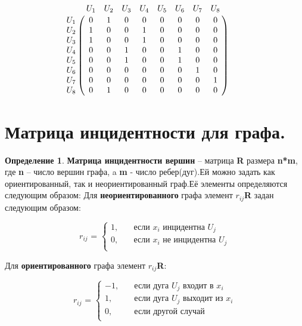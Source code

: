 \documentclass[12pt, a4paper, oneside]{article}
\theoremstyle{plain} %
\theoremstyle{definition}
\newtheorem*{definition}{Определение}  %
\newcommand{\indef}[1]{\textbf{ \color{dark_red} #1}}
\begin{document}
\[
 \bordermatrix{ & U_1 & U_2 & U_3 & U_4 & U_5 & U_6 & U_7& U_8  \cr
  U_1 & 0 & 1 & 0 & 0 & 0 & 0 & 0 & 0 \cr
  U_2 & 1 & 0 & 0 & 1 & 0 & 0 & 0 & 0   \cr
  U_3 & 1 & 0 & 0 & 1 & 0 & 0 & 0 & 0   \cr
  U_4 & 0 & 0 & 1 & 0 & 0 & 1 & 0 & 0 \cr
  U_5 & 0 & 0 & 1 & 0 & 0 & 1 & 0 & 0  \cr
  U_6 & 0 & 0 & 0 & 0 & 0 & 0 & 1 & 0 \cr
  U_7 & 0 & 0 & 0 & 0 & 0 & 0 & 0 & 1 \cr
  U_8 & 0 & 1 & 0 & 0 & 0 & 0 & 0 & 0  } \qquad
\] 

\section{Матрица инцидентности  для графа.}

\begin{definition}
\indef{Матрица инцидентности вершин} – матрица \textbf{R} размера \textbf{n*m}, где \textbf{n} – число вершин графа, a \textbf{m} - число ребер(дуг).Ей можно задать как ориентированный, так и неориентированный граф.Её элементы определяются следующим образом:
 Для \textbf{неориентированного} графа элемент \textbf{$r_{i j}$}\in \textbf{R} задан следующим образом:

\[ \textbf{$r_{i j}$ = } 
  \begin{cases}
    1,       & \quad \text{если } x_i \text{ инцидентна } U_j \\
    0,  & \quad \text{если } x_i \text{ не инцидентна } U_j\\
  \end{cases}
\]

Для \textbf{ориентированного} графа элемент \textbf{$r_{i j}$}\in \textbf{R}:

\[ \textbf{$r_{i j}$ = } 
  \begin{cases}
    -1,      &\quad\text{если дуга } U_j \text{ входит в } x_i \\
     1,       & \quad \text{если дуга } U_j \text{ выходит из } x_i \\
    0,  & \quad \text{если другой случай } \\
  \end{cases}
\]

\end{definition}
\end{document}
